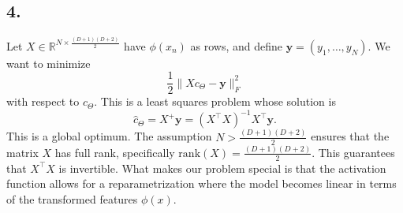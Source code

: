 \documentclass[a4paper, 12pt]{article}
\begin{document}
\subsection*{4.}
Let $X \in \mathbb{R}^{N \times \frac{(D+1)(D+2)}{2}}$ have $\phi(x_n)$ as rows, and define $\mathbf{y} = (y_1, \dots, y_N)$. We want to minimize
\[
\frac{1}{2} \| X c_\Theta - \mathbf{y} \|_F^2
\tag{7}\]
with respect to $c_\Theta$. This is a least squares problem whose solution is
\[
\hat{c}_\Theta = X^+ \mathbf{y} = (X^\top X)^{-1} X^\top \mathbf{y}.
\tag{8}\]
This is a global optimum. The assumption \( N > \frac{(D+1)(D+2)}{2} \) ensures that the matrix \( X \) has full rank, specifically \(\text{rank}(X) = \frac{(D+1)(D+2)}{2}\). This guarantees that \( X^\top X \) is invertible.
What makes our problem special is that the activation function allows for a reparametrization where the model becomes linear in terms of the transformed features $\phi(x)$. 
 
 
\end{document}
